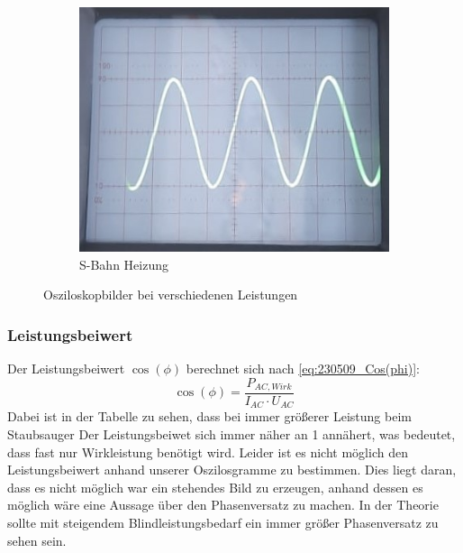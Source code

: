 \begin{figure}[H]
\begin{subfigure}[c]{0.19\textwidth}
		\includegraphics[width=\textwidth]{Abbildungen/Oszi_S-Bahn_Heiz.jpg}
		\caption{S-Bahn Heizung}
	\end{subfigure}
	\caption{Osziloskopbilder bei verschiedenen Leistungen}
	\label{fig:oszi}
\end{figure}


\subsubsection{Leistungsbeiwert}
Der Leistungsbeiwert $ \cos(\phi) $ berechnet sich nach \autoref{eq:230509_Cos(phi)}:
%
\begin{equation}
	\cos(\phi)=\frac{ P_{ AC,Wirk } }{  I_{ AC } \cdot U_{AC }}
	\label{eq:230509_Cos(phi)}
\end{equation}
%
Dabei ist in der Tabelle zu sehen, dass bei immer größerer Leistung beim Staubsauger Der Leistungsbeiwet sich immer näher an 1 annähert, was bedeutet, dass fast nur Wirkleistung benötigt wird. 
Leider ist es nicht möglich den Leistungsbeiwert anhand unserer Oszilosgramme zu bestimmen. 
Dies liegt daran, dass es nicht möglich war ein stehendes Bild zu erzeugen, anhand dessen es möglich wäre eine Aussage über den Phasenversatz zu machen. 
In der Theorie sollte mit steigendem Blindleistungsbedarf ein immer größer Phasenversatz zu sehen sein.